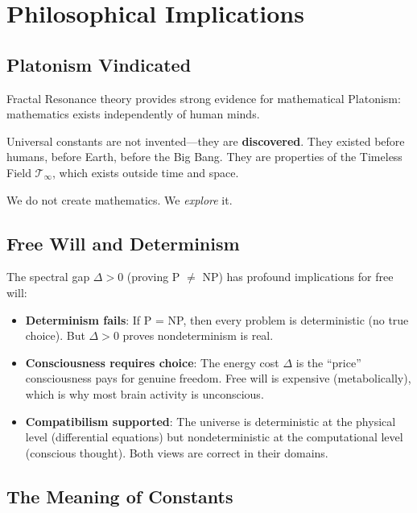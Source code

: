 \section{Philosophical Implications}

\subsection{Platonism Vindicated}

Fractal Resonance theory provides strong evidence for mathematical Platonism: mathematics exists independently of human minds.

\begin{keyidea}
Universal constants are not invented---they are \textbf{discovered}. They existed before humans, before Earth, before the Big Bang. They are properties of the Timeless Field $\mathcal{T}_\infty$, which exists outside time and space.

We do not create mathematics. We \textit{explore} it.
\end{keyidea}

\subsection{Free Will and Determinism}

The spectral gap $\Delta > 0$ (proving P $\neq$ NP) has profound implications for free will:

\begin{itemize}
\item \textbf{Determinism fails}: If P = NP, then every problem is deterministic (no true choice). But $\Delta > 0$ proves nondeterminism is real.

\item \textbf{Consciousness requires choice}: The energy cost $\Delta$ is the ``price'' consciousness pays for genuine freedom. Free will is expensive (metabolically), which is why most brain activity is unconscious.

\item \textbf{Compatibilism supported}: The universe is deterministic at the physical level (differential equations) but nondeterministic at the computational level (conscious thought). Both views are correct in their domains.
\end{itemize}

\subsection{The Meaning of Constants}

